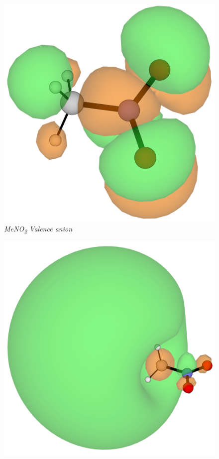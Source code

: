 \begin{figure}[h]
  \centering
  \begin{minipage}[b]{0.27\textwidth}
    \centering
    \includegraphics[width=\textwidth]{chapters/introduction/image/MeNO2_VBS.png}
    \small\emph{MeNO\textsubscript{2} Valence anion}
  \end{minipage}
  \hfill
  \begin{minipage}[b]{0.30\textwidth}
    \centering
    \includegraphics[width=\textwidth]{chapters/introduction/image/MeNO2_DBS.png}

\end{minipage}
\end{figure}
